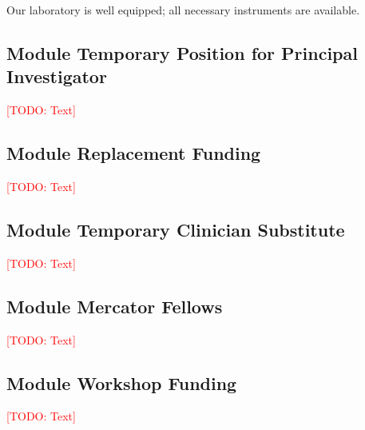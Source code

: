 \documentclass[american,firsttime]{dfgproposal}
\newcommand{\todo}[1]{\xspace{\textcolor{red}{[TODO: #1]}}\xspace}
\begin{document}
	Our laboratory is well equipped; all necessary instruments are available.
	
	
	
	\subsection{Module Temporary Position for Principal Investigator}
	\todo{Text}
	
	\subsection{Module Replacement Funding}
	\todo{Text}
	
	\subsection{Module Temporary Clinician Substitute}
	\todo{Text}
	
	\subsection{Module Mercator Fellows}
	\todo{Text}
	
	\subsection{Module Workshop Funding}
	\todo{Text}
	
\end{document}
